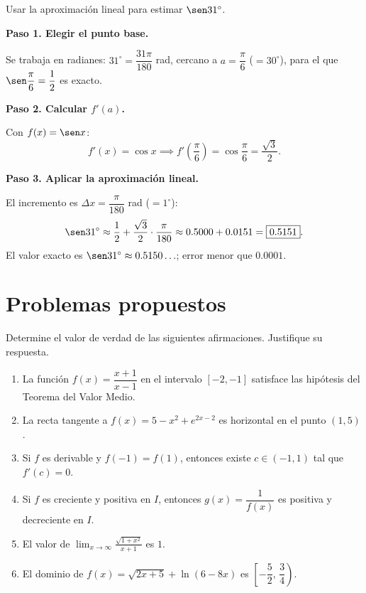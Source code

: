 \begin{example}
Usar la aproximación lineal para estimar $\sen 31^\circ$.
\begin{myproof}
\textbf{Paso 1. Elegir el punto base.}

Se trabaja en radianes: $31^\circ = \dfrac{31\pi}{180}$ rad, cercano
a $a=\dfrac{\pi}{6}$ ($=30^\circ$), para el que $\sen\dfrac{\pi}{6}=\dfrac{1}{2}$
es exacto.

\textbf{Paso 2. Calcular $f'(a)$.}

Con $f(x)=\sen x$:
\[
f'(x)=\cos x \implies f'\!\left(\frac{\pi}{6}\right)=\cos\frac{\pi}{6}
=\frac{\sqrt{3}}{2}.
\]

\textbf{Paso 3. Aplicar la aproximación lineal.}

El incremento es $\Delta x=\dfrac{\pi}{180}$ rad ($=1^\circ$):
\[
\sen 31^\circ \approx \frac{1}{2}+\frac{\sqrt{3}}{2}\cdot\frac{\pi}{180}
\approx 0.5000 + 0.0151 = \boxed{0.5151}.
\]
El valor exacto es $\sen 31^\circ\approx 0.5150\ldots$; error menor que $0.0001$.
\end{myproof}
\end{example}

\section{Problemas propuestos}
\begin{prob}
Determine el valor de verdad de las siguientes afirmaciones.
Justifique su respuesta.
\begin{enumerate}
    \item La función $f(x)=\dfrac{x+1}{x-1}$ en el intervalo
    $[-2,-1]$ satisface las hipótesis del Teorema del Valor Medio.

    \item La recta tangente a $f(x)=5-x^2+e^{2x-2}$ es horizontal
    en el punto $(1,5)$.

    \item Si $f$ es derivable y $f(-1)=f(1)$, entonces existe
    $c\in(-1,1)$ tal que $f'(c)=0$.

    \item Si $f$ es creciente y positiva en $I$, entonces
    $g(x)=\dfrac{1}{f(x)}$ es positiva y decreciente en $I$.

    \item El valor de
    $\displaystyle\lim_{x\to\infty}\frac{\sqrt{1+x^2}}{x+1}$ es $1$.

    \item El dominio de $f(x)=\sqrt{2x+5}+\ln(6-8x)$ es
    $\left[-\dfrac{5}{2},\,\dfrac{3}{4}\right)$.
\end{enumerate}
\end{prob}


